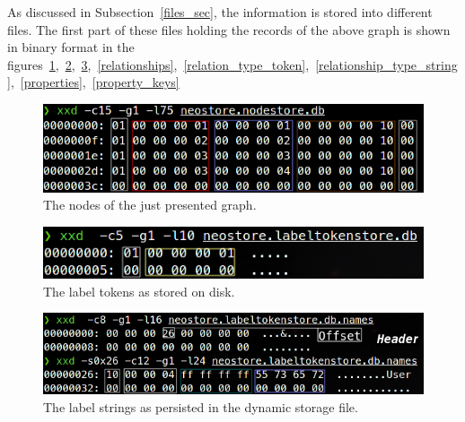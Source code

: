 \documentclass[a4paper,10pt]{article}
\begin{document}
    As discussed in Subsection~\ref{files_sec}, the information is stored into different files. 
    The first part of these files holding the records of the above graph is shown in binary format in the figures~\ref{nodes},~\ref{label_tokens},~\ref{label_strings},~\ref{relationships},~\ref{relation_type_token},~\ref{relationship_type_string},~\ref{properties},~\ref{property_keys}
    \begin{figure}[htp]\label{nodes}
        \begin{center}
            \includegraphics[keepaspectratio,height=1.2\textheight,width=1.2\textwidth]{img/04_example/nodes.png}
        \end{center}
        \caption{The nodes of the just presented graph.}
    \end{figure}
    \begin{figure}[htp]\label{label_tokens}
        \begin{center}
            \includegraphics[keepaspectratio,height=1.2\textheight,width=1.2\textwidth]{img/04_example/label_token.png}
        \end{center}
        \caption{The label tokens as stored on disk.} 
    \end{figure}
    \begin{figure}[htp]\label{label_strings}
        \begin{center}
            \includegraphics[keepaspectratio,height=1.2\textheight,width=1.2\textwidth]{img/04_example/labels_string_dynamic.png}
        \end{center}
        \caption{The label strings as persisted in the dynamic storage file.}
    \end{figure}
\end{document}
